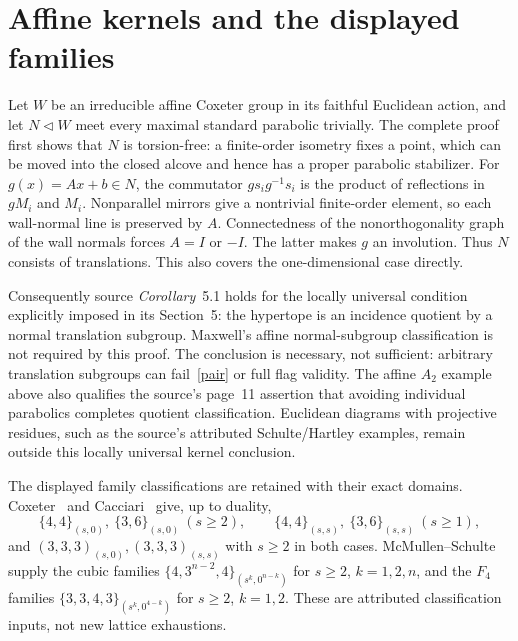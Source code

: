 \documentclass[11pt,a4paper]{article}
\begin{document}
\section{Affine kernels and the displayed families}\label{affine}
Let $W$ be an irreducible affine Coxeter group in its faithful Euclidean
action, and let $N\triangleleft W$ meet every maximal standard parabolic
trivially. The complete proof~\cite{translation} first shows that $N$ is
torsion-free: a finite-order isometry fixes a point, which can be moved
into the closed alcove and hence has a proper parabolic stabilizer.
For $g(x)=Ax+b\in N$, the commutator $gs_ig^{-1}s_i$ is the product
of reflections in $gM_i$ and $M_i$. Nonparallel mirrors give a nontrivial
finite-order element, so each wall-normal line is preserved by $A$.
Connectedness of the nonorthogonality graph of the wall normals forces
$A=I$ or $-I$. The latter makes $g$ an involution. Thus $N$ consists of
translations. This also covers the one-dimensional case directly.

Consequently source \emph{Corollary}~5.1 holds for the locally universal
condition explicitly imposed in its Section~5: the hypertope is an incidence
quotient by a normal translation subgroup. Maxwell's affine normal-subgroup
classification is not required by this proof. The conclusion is necessary,
not sufficient: arbitrary translation subgroups can fail~\eqref{pair}
or full flag validity. The affine $A_2$ example above also qualifies the
source's page~11 assertion that avoiding individual parabolics completes
quotient classification. Euclidean diagrams with projective residues, such
as the source's attributed Schulte/Hartley examples, remain outside this
locally universal kernel conclusion.

The displayed family classifications are retained with their exact domains.
Coxeter~\cite{CoxeterMaps} and Cacciari~\cite{Cacciari} give, up to duality,
\[
 \{4,4\}_{(s,0)},\ \{3,6\}_{(s,0)}\ (s\ge2),\qquad
 \{4,4\}_{(s,s)},\ \{3,6\}_{(s,s)}\ (s\ge1),
\]
and $(3,3,3)_{(s,0)},(3,3,3)_{(s,s)}$ with $s\ge2$ in both cases.
McMullen--Schulte~\cite{Toroids,Polytopes} supply the cubic families
$\{4,3^{n-2},4\}_{(s^k,0^{n-k})}$ for $s\ge2$, $k=1,2,n$, and
the $F_4$ families $\{3,3,4,3\}_{(s^k,0^{4-k})}$ for $s\ge2$, $k=1,2$.
These are attributed classification inputs, not new lattice exhaustions.
\end{document}
